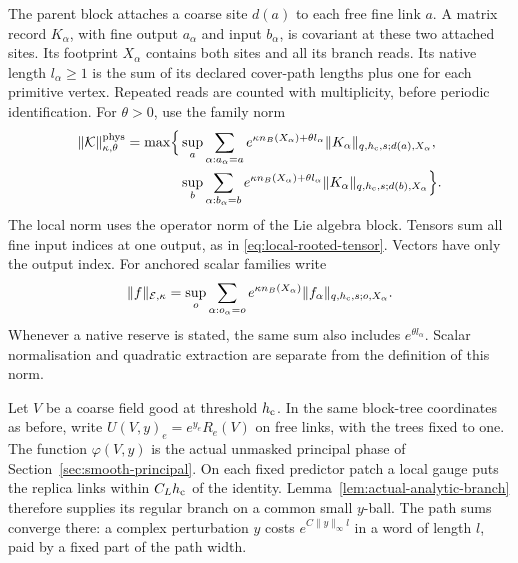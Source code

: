 \documentclass[11pt,reqno]{amsart}
\numberwithin{equation}{section}
\theoremstyle{definition}
\theoremstyle{remark}
\begin{document}
The parent block attaches a coarse site \(d(a)\)
to each free fine link \(a\).
A matrix record \(K_\alpha\), with fine output
\(a_\alpha\) and input \(b_\alpha\), is covariant
at these two attached sites.
Its footprint \(X_\alpha\) contains both sites
and all its branch reads.
Its native length \(l_\alpha\ge1\) is the sum
of its declared cover-path lengths plus one
for each primitive vertex.
Repeated reads are counted with multiplicity,
before periodic identification.
For \(\theta>0\), use the family norm
\begin{equation}
 \begin{split}
 \|\mathcal K\|_{\kappa,\theta}^{\rm phys}
 =\max\Bigl\{&
 \sup_a\sum_{\alpha:a_\alpha=a}
   e^{\kappa n_B(X_\alpha)+\theta l_\alpha}
       \|K_\alpha\|_{q,h_{\rm c},s;d(a),X_\alpha},\\
 &\sup_b\sum_{\alpha:b_\alpha=b}
   e^{\kappa n_B(X_\alpha)+\theta l_\alpha}
       \|K_\alpha\|_{q,h_{\rm c},s;d(b),X_\alpha}
                                                        \Bigr\}.
 \end{split}
 \label{eq:compatible-kernel-family-norm}
\end{equation}
The local norm uses the operator norm of the
Lie algebra block. Tensors sum all fine input
indices at one output, as in
\eqref{eq:local-rooted-tensor}.
Vectors have only the output index.
For anchored scalar families write
\begin{equation}
 \|f\|_{\mathcal E,\kappa}
       =\sup_o\sum_{\alpha:o_\alpha=o}
           e^{\kappa n_B(X_\alpha)}
              \|f_\alpha\|_{q,h_{\rm c},s;o,X_\alpha}.
 \label{eq:compatible-scalar-family-norm}
\end{equation}
Whenever a native reserve is stated, the same
sum also includes \(e^{\theta l_\alpha}\).
Scalar normalisation and quadratic extraction
are separate from the definition of this norm.

Let \(V\) be a coarse field good at threshold
\(h_{\rm c}\). In the same block-tree coordinates
as before, write \(U(V,y)_e=e^{y_e}R_e(V)\)
on free links, with the trees fixed to one.
The function \(\varphi(V,y)\) is the actual
unmasked principal phase of
Section~\ref{sec:smooth-principal}.
On each fixed predictor patch a local gauge
puts the replica links within \(C_Lh_{\rm c}\)
of the identity. Lemma~\ref{lem:actual-analytic-branch}
therefore supplies its regular branch on a
common small \(y\)-ball.
The path sums converge there: a complex
perturbation \(y\) costs \(e^{C\|y\|_\infty l}\)
in a word of length \(l\), paid by a fixed
part of the path width.
\end{document}
